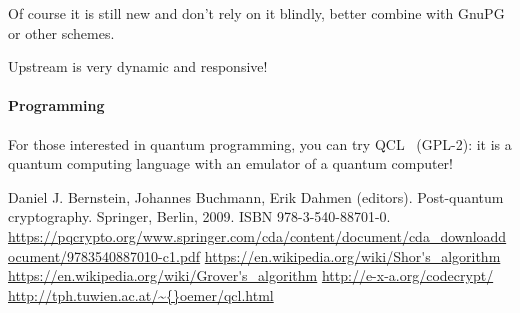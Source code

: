 \documentclass[10pt, a5paper]{article}
\begin{document}
Of course it is still new and don't rely on it blindly, better combine with GnuPG or other schemes.

Upstream is very dynamic and responsive!

\paragraph{Programming}

For those interested in quantum programming, you can try QCL~\cite{Savchenko5} (GPL-2): it is a quantum computing language with an emulator of a quantum computer!

\begin{thebibliography}{99}
Daniel J. Bernstein, Johannes Buchmann, Erik Dahmen (editors). Post-quantum cryptography. Springer, Berlin, 2009. ISBN 978-3-540-88701-0. \url{https://pqcrypto.org/www.springer.com/cda/content/document/cda\_downloaddocument/9783540887010-c1.pdf}
\url{https://en.wikipedia.org/wiki/Shor's\_algorithm}
\url{https://en.wikipedia.org/wiki/Grover's\_algorithm}
\url{http://e-x-a.org/codecrypt/}
\url{http://tph.tuwien.ac.at/\~{}oemer/qcl.html}
\end{thebibliography}
\end{document}
